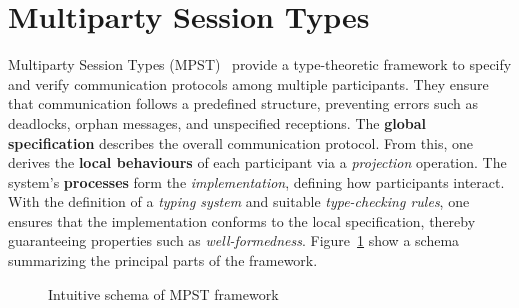 \section{Multiparty Session Types}
Multiparty Session Types (MPST)~\cite{honda2008multiparty} 
provide a type-theoretic framework to specify and verify communication 
protocols among multiple participants. They ensure that communication 
follows a predefined structure, preventing errors such as deadlocks, 
orphan messages, and unspecified receptions. The 
\textbf{global specification} describes the overall communication 
protocol. From this, one derives the \textbf{local behaviours} of each 
participant via a \emph{projection} operation. The system's 
\textbf{processes} form the \emph{implementation}, defining how 
participants interact. With the definition of a \emph{typing system} 
and suitable \emph{type-checking rules}, one ensures that the 
implementation conforms to the local specification, thereby 
guaranteeing properties such as \emph{well-formedness}.  
Figure~\ref{fig:mpstschema} show a schema summarizing the principal
parts of the framework.

\begin{figure}[!ht]
\centering
{}
\caption{Intuitive schema of MPST framework}
\label{fig:mpstschema}
\end{figure}

